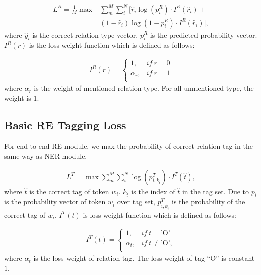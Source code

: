 \begin{align*}
  L^R = \frac{1}{M} \max &\sum_m^M\sum_i^N
  \biggl[ \hat{r}_i \log(p_i^R) \cdot I^R(\hat{r}_i) + \\
  &{} (1 - \hat{r}_i) \log(1 - p_i^R) \cdot I^R(\hat{r}_i)
    \biggr],
\end{align*}
where $\hat{y}_i$ is the correct relation type vector. $p_i^R$ is the predicted
probability vector. $I^R(r)$ is the loss weight function which is defined as
follows:

\begin{equation}
  \begin{aligned}
    I^R(r) =
    \begin{cases}
      1,        & if \  r = 0 \\
      \alpha_r, & if \  r = 1 \\
    \end{cases} \nonumber
  \end{aligned}
\end{equation}
where $\alpha_r$ is the weight of mentioned relation type. For all unmentioned type,
the weight is 1.

\subsection{Basic RE Tagging Loss}
For end-to-end RE module, we max the probability of correct relation tag in the
same way as NER module.

\begin{equation}
  \begin{aligned}
    L^T = \max{
      \sum_m^M{
        \sum_i^N{
            \log(p_{i, k_{\hat{t}}}^T) \cdot I^T(\hat{t}),
        }
      }
    } \nonumber
  \end{aligned}
\end{equation}
where $\hat{t}$ is the correct tag of token $w_i$. $k_{\hat{t}}$ is the index of
$\hat{t}$ in the tag set. Due to $p_i$ is the probability vector of token $w_i$
over tag set, $p_{i, k_{\hat{t}}}^T$ is the probability of the correct tag of
$w_i$. $I^T(t)$ is loss weight function which is defined as follows:

\begin{equation}
  \begin{aligned}
    I^T(t) =
    \begin{cases}
      1,        & if \  t = \text{'O'} \\
      \alpha_t, & if \  t \neq \text{'O'}, \\
    \end{cases} \nonumber
  \end{aligned}
\end{equation}
where $\alpha_t$ is the loss weight of relation tag. The loss weight of tag ``O'' is
constant $1$.

